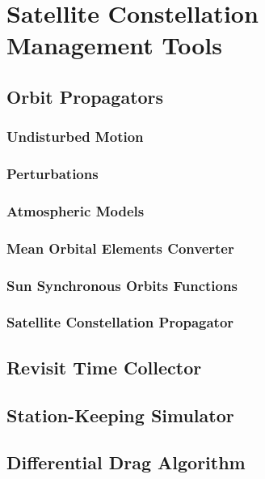 \chapter{Satellite Constellation Management Tools} \label{chapter_tools}


\section{Orbit Propagators}

\subsection{Undisturbed Motion}
\subsection{Perturbations}
\subsection{Atmospheric Models}
\subsection{Mean Orbital Elements Converter}
\subsection{Sun Synchronous Orbits Functions}
\subsection{Satellite Constellation Propagator}

\section{Revisit Time Collector}

\section{Station-Keeping Simulator}

\section{Differential Drag Algorithm}